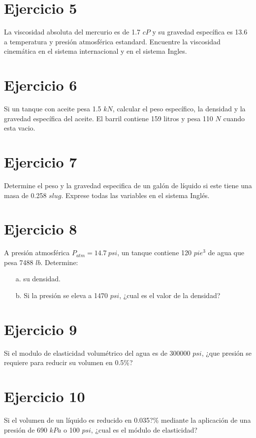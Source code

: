 \documentclass[12pt]{article}
\begin{document}
\section*{Ejercicio 5}\vspace{-0.3cm}
La viscosidad absoluta del mercurio es de 1.7 $cP$ y su gravedad espec\'ifica es 13.6 a temperatura y presi\'on atmosf\'erica estandard. Encuentre la viscosidad cinem\'atica en el sistema internacional y en el sistema Ingles.

\section*{Ejercicio 6}\vspace{-0.3cm}
Si un tanque con aceite pesa 1.5 $kN$, calcular el peso espec\'ifico, la densidad y la gravedad espec\'ifica del aceite. El barril contiene 159 litros y pesa 110 $N$ cuando esta vacio. 

\section*{Ejercicio 7}\vspace{-0.3cm}
Determine el peso y la gravedad especifica de un gal\'on de l\'iquido si este tiene una masa de 0.258 $slug$. Exprese todas las variables en el sistema Ingl\'es.

\section*{Ejercicio 8}\vspace{-0.3cm}
A presi\'on atmosf\'erica $P_{atm}=14.7\ psi$, un tanque contiene 120 $pie^3$ de agua que pesa 7488 $lb$. Determine:
\begin{itemize}
\item[a.] su densidad.
\item[b.] Si la presi\'on se eleva a 1470 $psi$, ¿cual es el valor de la densidad?
\end{itemize}

\section*{Ejercicio 9}\vspace{-0.3cm}
Si el modulo de elasticidad volum\'etrico del agua es de 300000 $psi$, ¿que presi\'on se requiere para reducir su volumen en 0.5\%?
	
\section*{Ejercicio 10}\vspace{-0.3cm}
Si el volumen de un l\'iquido es reducido en 0.035?\% mediante la aplicaci\'on de una presi\'on de 690 $kPa$ o 100 $psi$, ¿cual es el m\'odulo de elasticidad?
\end{document}
